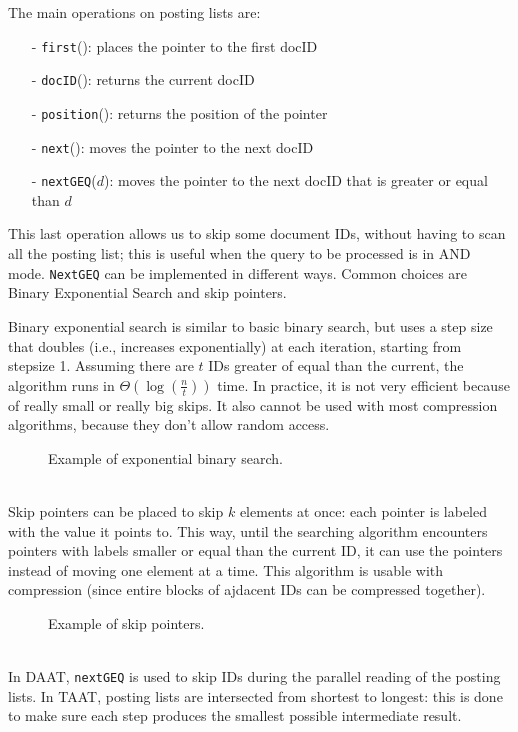 The main operations on posting lists are:
\begin{itemize}[itemsep=0pt]
    \item[-] \texttt{first}(): places the pointer to the first docID
    \item[-] \texttt{docID}(): returns the current docID
    \item[-] \texttt{position}(): returns the position of the pointer
    \item[-] \texttt{next}(): moves the pointer to the next docID
    \item[-] \texttt{nextGEQ}($d$): moves the pointer to the next docID that is greater or equal than $d$
\end{itemize}
This last operation allows us to skip some document IDs, without having to scan all the posting list; this is useful when the query to be processed is in AND mode. \texttt{NextGEQ} can be implemented in different ways. Common choices are Binary Exponential Search and skip pointers.

Binary exponential search is similar to basic binary search, but uses a step size that doubles (i.e., increases exponentially) at each iteration, starting from stepsize 1. Assuming there are $t$ IDs greater of equal than the current, the algorithm runs in $\Theta (\log(\frac{n}{t}))$ time. In practice, it is not very efficient because of really small or really big skips. It also cannot be used with most compression algorithms, because they don't allow random access.
\begin{figure}[!ht]
    \centering
    
    \caption{Example of exponential binary search.}
    \label{fig:binary-search}
\end{figure} \\
Skip pointers can be placed to skip $k$ elements at once: each pointer is labeled with the value it points to. This way, until the searching algorithm encounters pointers with labels smaller or equal than the current ID, it can use the pointers instead of moving one element at a time. This algorithm is usable with compression (since entire blocks of ajdacent IDs can be compressed together).
\begin{figure}[!ht]
    \centering
    
    \caption{Example of skip pointers.}
    \label{fig:skip-pointers}
\end{figure} \\
In DAAT, \texttt{nextGEQ} is used to skip IDs during the parallel reading of the posting lists. In TAAT, posting lists are intersected from shortest to longest: this is done to make sure each step produces the smallest possible intermediate result.

